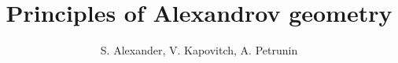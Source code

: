 \frontmatter
\title{Principles of Alexandrov geometry}
\author{S. Alexander, V. Kapovitch, A. Petrunin}
\maketitle